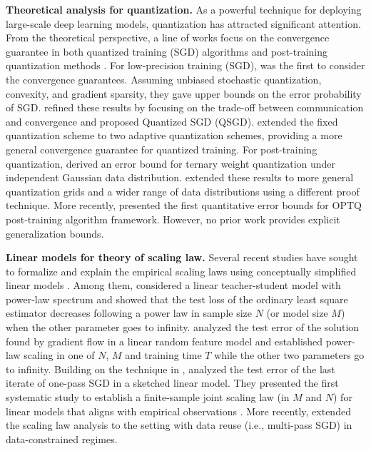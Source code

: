 \documentclass[11pt, letterpaper]{article}
\begin{document}
\textbf{Theoretical analysis for quantization.}
As a powerful technique for deploying large-scale deep learning models, quantization has attracted significant attention. From the theoretical perspective, a line of works focus on the convergence guarantee in both quantized training (SGD) algorithms \citep{de2015taming,alistarh2017qsgd,faghri2020adaptive,gorbunov2020unified,gandikota2021vqsgd,markov2023quantized,xin2025global} and post-training quantization methods \citep{lybrand2021greedy,zhang2023spfq,zhang2023post,zhang2025provable}. For low-precision training (SGD), \citet{de2015taming} was the first to consider the convergence guarantees. Assuming unbiased stochastic quantization, convexity, and gradient sparsity, they gave upper bounds on the error probability of SGD. \citet{alistarh2017qsgd} refined these results by focusing on the trade-off between communication and convergence and proposed Quantized SGD (QSGD). \citet{faghri2020adaptive} extended the fixed quantization scheme \citep{alistarh2017qsgd} to two adaptive quantization schemes, providing a more general convergence guarantee for quantized training. For post-training quantization, \citet{lybrand2021greedy} derived an error bound for ternary weight quantization under independent Gaussian data distribution. \citet{zhang2023post} extended these results to more general quantization grids and a wider range of data distributions using a different proof technique. More recently, \citet{zhang2025provable} presented the first
quantitative error bounds for OPTQ post-training algorithm framework. However, no prior work provides explicit generalization bounds. 

\textbf{Linear models for theory of scaling law.}
Several recent studies have sought to formalize and explain the empirical scaling laws using conceptually simplified linear models \citep{bahri2024explaining, atanasov2024scaling, paquette20244+, bordelon2024dynamical, lin2024scaling, lin2025improved}. Among them, \citet{bahri2024explaining} considered a linear teacher-student model with power-law spectrum and showed that the test loss of the ordinary least square estimator decreases following a power law in sample size $N$ (or model size $M$) when the other parameter goes to infinity. \citet{bordelon2024dynamical} analyzed the test error of the solution found by gradient flow in a linear random feature model and established power-law scaling in one of $N$, $M$ and training time $T$ while the other two parameters go to infinity. Building on the technique in \citet{zou2023benign}, \citet{lin2024scaling} analyzed the test error of the last iterate of one-pass SGD in a sketched linear model. They presented the first systematic study to establish a finite-sample joint scaling law (in $M$ and $N$) for linear models that aligns with empirical observations \citep{kaplan2020scaling}. More recently, \citet{lin2025improved} extended the scaling law analysis to the setting with data reuse (i.e., multi-pass SGD) in data-constrained regimes.%
\end{document}
